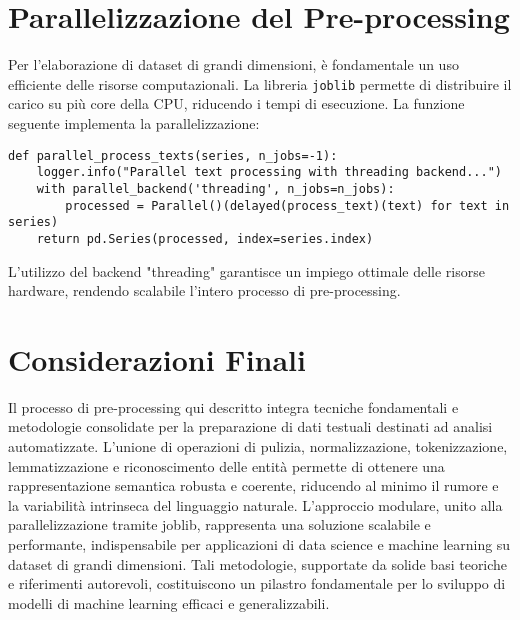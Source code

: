 \section{Parallelizzazione del Pre-processing}
Per l'elaborazione di dataset di grandi dimensioni, è fondamentale un uso efficiente delle risorse computazionali. La libreria \texttt{joblib} permette di distribuire il carico su più core della CPU, riducendo i tempi di esecuzione. La funzione seguente implementa la parallelizzazione:

\begin{lstlisting}[caption={Funzione parallel\_process\_texts}]
def parallel_process_texts(series, n_jobs=-1):
    logger.info("Parallel text processing with threading backend...")
    with parallel_backend('threading', n_jobs=n_jobs):
        processed = Parallel()(delayed(process_text)(text) for text in series)
    return pd.Series(processed, index=series.index)
\end{lstlisting}

L'utilizzo del backend "threading" garantisce un impiego ottimale delle risorse hardware, rendendo scalabile l'intero processo di pre-processing.

\section{Considerazioni Finali}
Il processo di pre-processing qui descritto integra tecniche fondamentali e metodologie consolidate per la preparazione di dati testuali destinati ad analisi automatizzate. L'unione di operazioni di pulizia, normalizzazione, tokenizzazione, lemmatizzazione e riconoscimento delle entità permette di ottenere una rappresentazione semantica robusta e coerente, riducendo al minimo il rumore e la variabilità intrinseca del linguaggio naturale. 
L'approccio modulare, unito alla parallelizzazione tramite joblib, rappresenta una soluzione scalabile e performante, indispensabile per applicazioni di data science e machine learning su dataset di grandi dimensioni. Tali metodologie, supportate da solide basi teoriche e riferimenti autorevoli, costituiscono un pilastro fondamentale per lo sviluppo di modelli di machine learning efficaci e generalizzabili.
